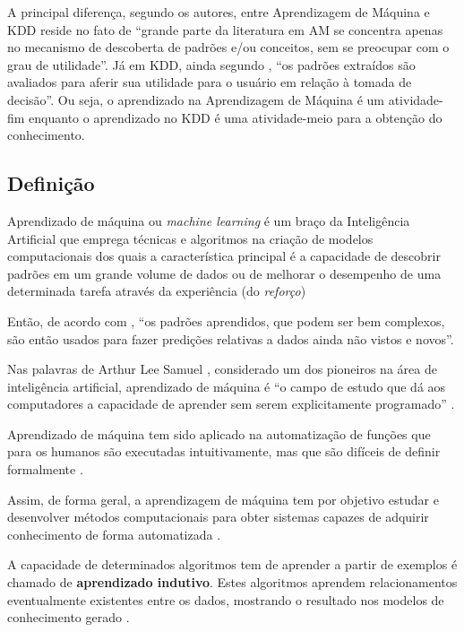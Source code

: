 A principal diferença, segundo os autores,  entre Aprendizagem de Máquina e KDD reside no fato de ``grande parte da literatura em AM se concentra apenas no mecanismo de descoberta de padrões e/ou conceitos, sem se preocupar com o grau de utilidade''. Já em KDD, ainda segundo , ``os padrões extraídos são avaliados para aferir sua utilidade para o usuário em relação à tomada de decisão''. Ou seja, o aprendizado na Aprendizagem de Máquina é um atividade-fim enquanto o aprendizado no KDD é uma atividade-meio para a obtenção do conhecimento.

\subsection{Definição}
Aprendizado de máquina ou \textit{machine learning} é um braço da Inteligência Artificial que emprega técnicas e algoritmos na criação de modelos computacionais dos quais a característica principal é a capacidade de descobrir padrões em um grande volume de dados ou de melhorar o desempenho de uma determinada tarefa através da experiência (do \textit{reforço}) \cite{mohri_foundations_2018} \cite{alpaydin_introduction_2014} \cite{swamynathan_mastering_2019}

Então, de acordo com , ``os padrões aprendidos, que podem ser bem complexos, são então usados para fazer predições relativas a dados ainda não vistos e novos''.

Nas palavras de Arthur Lee Samuel , considerado um dos pioneiros na área de inteligência artificial, aprendizado de máquina é ``o campo de estudo que dá aos computadores a capacidade de aprender sem serem explicitamente programado'' \cite[p. 89]{simon_too_2013}. 

Aprendizado de máquina tem sido aplicado na automatização de funções que para os humanos são executadas intuitivamente, mas que são difíceis de definir formalmente \cite{sarkar_2017}.

Assim, de forma geral, a aprendizagem de máquina tem por objetivo estudar e desenvolver métodos computacionais para obter sistemas capazes de adquirir conhecimento de forma automatizada \cite{lima_ia_2016}.

A capacidade de determinados algoritmos tem de aprender a partir de exemplos é chamado de \textbf{aprendizado indutivo}. Estes algoritmos aprendem relacionamentos eventualmente existentes entre os dados, mostrando o resultado nos modelos de conhecimento gerado \cite{goldschmidt2005} \cite{alpaydin_introduction_2014}.

